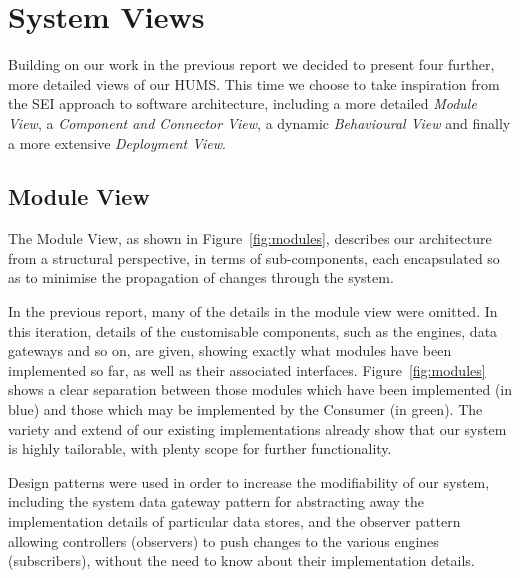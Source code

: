 \documentclass[10pt,a4paper]{article}
\begin{document}
\section{System Views} 
Building on our work in the previous report we decided to present four further, more detailed views of our HUMS. This time we choose to take inspiration from the SEI \cite{Bass98} approach to software architecture, including a more detailed \emph{Module View}, a \emph{Component and Connector View}, a dynamic \emph{Behavioural View} and finally a more extensive \emph{Deployment View}.

\subsection{Module View}
\label{sec:views}
The Module View, as shown in Figure~\ref{fig:modules}, describes our architecture from a structural perspective, in terms of sub-components, each encapsulated so as to minimise the propagation of changes through the system. %

In the previous report, many of the details in the module view were omitted. In this iteration, details of the customisable components, such as the engines, data gateways and so on, are given, showing exactly what modules have been implemented so far, as well as their associated interfaces. Figure~\ref{fig:modules} shows a clear separation between those modules which have been implemented (in blue) and those which may be implemented by the Consumer (in green). The variety and extend of our existing implementations already show that our system is highly tailorable, with plenty scope for further functionality.

Design patterns were used in order to increase the modifiability of our system, including the system data gateway pattern for abstracting away the implementation details of particular data stores, and the observer pattern allowing controllers (observers) to push changes to the various engines (subscribers), without the need to know about their implementation details.
\end{document}
